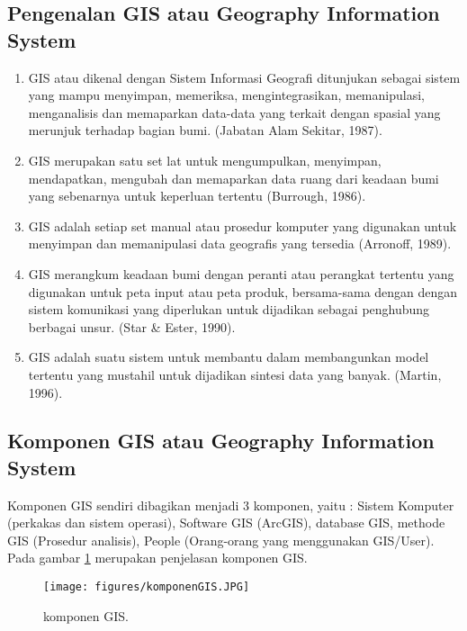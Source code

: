 \subsection{Pengenalan GIS atau Geography Information System}
\begin{enumerate}
	
\item GIS atau dikenal dengan Sistem Informasi Geografi ditunjukan sebagai sistem yang mampu menyimpan, memeriksa, mengintegrasikan, memanipulasi, menganalisis dan memaparkan data-data yang terkait dengan spasial yang merunjuk terhadap bagian bumi. (Jabatan Alam Sekitar, 1987).

\item GIS merupakan satu set lat untuk mengumpulkan, menyimpan, mendapatkan, mengubah dan memaparkan data ruang dari keadaan  bumi yang sebenarnya untuk keperluan tertentu (Burrough, 1986).

\item GIS adalah setiap set manual atau prosedur komputer yang digunakan untuk menyimpan dan memanipulasi data geografis yang tersedia (Arronoff, 1989).

\item GIS merangkum keadaan bumi dengan peranti atau perangkat tertentu yang digunakan untuk peta input atau peta produk, bersama-sama dengan dengan sistem komunikasi yang diperlukan untuk dijadikan sebagai penghubung berbagai unsur. (Star \& Ester, 1990).

\item GIS adalah suatu sistem untuk membantu dalam membangunkan model tertentu yang mustahil untuk dijadikan sintesi data yang banyak. (Martin, 1996).

\end{enumerate}

\subsection{Komponen GIS atau Geography Information System}
Komponen GIS sendiri dibagikan menjadi 3 komponen, yaitu :
Sistem Komputer (perkakas dan sistem operasi), Software GIS
(ArcGIS), database GIS, methode GIS (Prosedur analisis), People (Orang-orang yang menggunakan GIS/User).
Pada gambar \ref{komponenGIS} merupakan penjelasan komponen GIS.

\begin{figure}[ht]
	\centerline{\texttt{[image: figures/komponenGIS.JPG]}}
	\caption{komponen GIS.}
	\label{komponenGIS}
	\end{figure}

